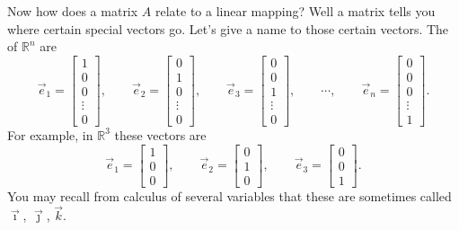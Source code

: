 \documentclass{ximera}
\begin{document}
Now how does a matrix $A$ relate to a linear mapping? Well a matrix tells you where certain special vectors go.  Let's give a name to those certain vectors. The \emph{} of ${\mathbb R}^n$ are
\begin{equation*}
    \vec{e}_1 =
    \begin{bmatrix}
        1 \\ 0 \\ 0 \\ \vdots \\ 0
    \end{bmatrix} ,
    \qquad \vec{e}_2 =
    \begin{bmatrix}
        0 \\ 1 \\ 0 \\ \vdots \\ 0
    \end{bmatrix} ,
    \qquad \vec{e}_3 =
    \begin{bmatrix}
        0 \\ 0 \\ 1 \\ \vdots \\ 0
    \end{bmatrix} ,
    \qquad \cdots , \qquad \vec{e}_n =
    \begin{bmatrix}
        0 \\ 0 \\ 0 \\ \vdots \\ 1
    \end{bmatrix} .
\end{equation*}
For example, in ${\mathbb R}^3$ these vectors are
\begin{equation*}
    \vec{e}_1 =
    \begin{bmatrix}
        1 \\ 0 \\ 0
    \end{bmatrix} ,
    \qquad \vec{e}_2 =
    \begin{bmatrix}
        0 \\ 1 \\ 0
    \end{bmatrix} ,
    \qquad \vec{e}_3 =
    \begin{bmatrix}
        0 \\ 0 \\ 1
    \end{bmatrix} .
\end{equation*}
You may recall from calculus of several variables that these are sometimes called $\vec{\imath}$, $\vec{\jmath}$, $\vec{k}$.
\end{document}
